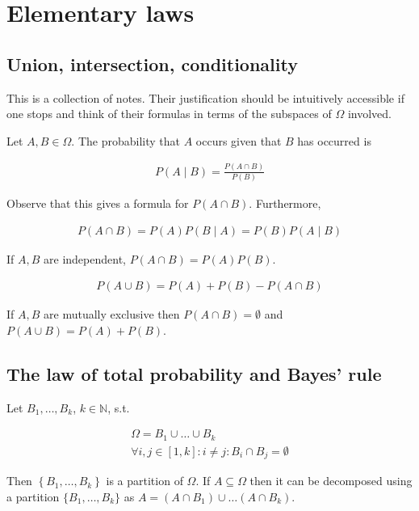 \documentclass[a4paper, 12pt]{article}
\begin{document}
\section{Elementary laws}

\subsection{Union, intersection, conditionality}

This is a collection of notes. Their justification should be intuitively
accessible if one stops and think of their formulas in terms of the subspaces of
$\Omega$ involved.

Let $A, B \in \Omega$. The probability that $A$ occurs given that $B$ has
occurred is 

\begin{align*}
    P(A \mid B) = \frac{P (A \cap B)}{P(B)}
\end{align*}    

Observe that this gives a formula for $P(A \cap B)$. Furthermore, 

\begin{align*}
    P(A \cap B) = P(A)P(B \mid A) = P(B)P(A \mid B)
\end{align*}

If $A, B$ are independent, $P(A \cap B) = P(A)P(B)$.

\begin{align*}
    P(A \cup B) = P(A) + P(B) - P(A \cap B)
\end{align*}

If $A, B$ are mutually exclusive then $P(A \cap B) = \emptyset$ and $P(A \cup B)
= P(A) + P(B)$.

\subsection{The law of total probability and Bayes' rule}

Let $B_1, \ldots, B_k$, $k \in \mathbb{N}$, s.t. 

\begin{align*}
    \Omega = B_1 \cup \ldots \cup B_k \\ 
    \forall i, j \in [1, k] : i \neq j : B_i \cap  B_j = \emptyset
\end{align*}

Then $\left\{ B_1, \ldots, B_k \right\} $ is a partition of $\Omega$. If $A
\subseteq \Omega$ then it can be decomposed using a partition $\{B_1, \ldots,
B_k\}$ as $A = (A \cap B_1) \cup \ldots (A \cap B_k)$.
\end{document}
